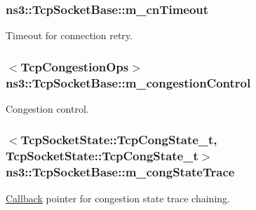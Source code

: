 \subsubsection[{\texorpdfstring{m\+\_\+cn\+Timeout}{m_cnTimeout}}]{ ns3\+::\+Tcp\+Socket\+Base\+::m\+\_\+cn\+Timeout\hspace{0.3cm}{\ttfamily [protected]}}\hypertarget{classns3_1_1TcpSocketBase_a7ee27f03de14c2f9f3d8fcda1e32352e}{}\label{classns3_1_1TcpSocketBase_a7ee27f03de14c2f9f3d8fcda1e32352e}


Timeout for connection retry. 

\subsubsection[{\texorpdfstring{m\+\_\+congestion\+Control}{m_congestionControl}}]{$<${\bf Tcp\+Congestion\+Ops}$>$ ns3\+::\+Tcp\+Socket\+Base\+::m\+\_\+congestion\+Control\hspace{0.3cm}{\ttfamily [protected]}}\hypertarget{classns3_1_1TcpSocketBase_a090719d52b06a791341e2fefa5e12c3e}{}\label{classns3_1_1TcpSocketBase_a090719d52b06a791341e2fefa5e12c3e}


Congestion control. 

\subsubsection[{\texorpdfstring{m\+\_\+cong\+State\+Trace}{m_congStateTrace}}]{$<${\bf Tcp\+Socket\+State\+::\+Tcp\+Cong\+State\+\_\+t}, {\bf Tcp\+Socket\+State\+::\+Tcp\+Cong\+State\+\_\+t}$>$ ns3\+::\+Tcp\+Socket\+Base\+::m\+\_\+cong\+State\+Trace}\hypertarget{classns3_1_1TcpSocketBase_a682c31efa86a22cbffae1f4ba7c0bbc4}{}\label{classns3_1_1TcpSocketBase_a682c31efa86a22cbffae1f4ba7c0bbc4}


\hyperlink{classns3_1_1Callback}{Callback} pointer for congestion state trace chaining. 

